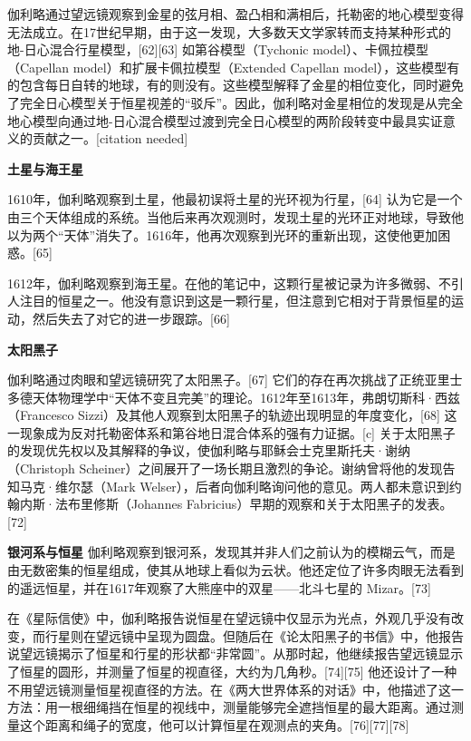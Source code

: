 伽利略通过望远镜观察到金星的弦月相、盈凸相和满相后，托勒密的地心模型变得无法成立。在17世纪早期，由于这一发现，大多数天文学家转而支持某种形式的地-日心混合行星模型，[62][63] 如第谷模型（Tychonic model）、卡佩拉模型（Capellan model）和扩展卡佩拉模型（Extended Capellan model），这些模型有的包含每日自转的地球，有的则没有。这些模型解释了金星的相位变化，同时避免了完全日心模型关于恒星视差的“驳斥”。因此，伽利略对金星相位的发现是从完全地心模型向通过地-日心混合模型过渡到完全日心模型的两阶段转变中最具实证意义的贡献之一。[citation needed]

\textbf{土星与海王星}  

1610年，伽利略观察到土星，他最初误将土星的光环视为行星，[64] 认为它是一个由三个天体组成的系统。当他后来再次观测时，发现土星的光环正对地球，导致他以为两个“天体”消失了。1616年，他再次观察到光环的重新出现，这使他更加困惑。[65]  

1612年，伽利略观察到海王星。在他的笔记中，这颗行星被记录为许多微弱、不引人注目的恒星之一。他没有意识到这是一颗行星，但注意到它相对于背景恒星的运动，然后失去了对它的进一步跟踪。[66]  

\textbf{太阳黑子}  

伽利略通过肉眼和望远镜研究了太阳黑子。[67] 它们的存在再次挑战了正统亚里士多德天体物理学中“天体不变且完美”的理论。1612年至1613年，弗朗切斯科·西兹（Francesco Sizzi）及其他人观察到太阳黑子的轨迹出现明显的年度变化，[68] 这一现象成为反对托勒密体系和第谷地日混合体系的强有力证据。[c] 关于太阳黑子的发现优先权以及其解释的争议，使伽利略与耶稣会士克里斯托夫·谢纳（Christoph Scheiner）之间展开了一场长期且激烈的争论。谢纳曾将他的发现告知马克·维尔瑟（Mark Welser），后者向伽利略询问他的意见。两人都未意识到约翰内斯·法布里修斯（Johannes Fabricius）早期的观察和关于太阳黑子的发表。[72]  

\textbf{银河系与恒星}  
伽利略观察到银河系，发现其并非人们之前认为的模糊云气，而是由无数密集的恒星组成，使其从地球上看似为云状。他还定位了许多肉眼无法看到的遥远恒星，并在1617年观察了大熊座中的双星——北斗七星的 Mizar。[73]  

在《星际信使》中，伽利略报告说恒星在望远镜中仅显示为光点，外观几乎没有改变，而行星则在望远镜中呈现为圆盘。但随后在《论太阳黑子的书信》中，他报告说望远镜揭示了恒星和行星的形状都“非常圆”。从那时起，他继续报告望远镜显示了恒星的圆形，并测量了恒星的视直径，大约为几角秒。[74][75] 他还设计了一种不用望远镜测量恒星视直径的方法。在《两大世界体系的对话》中，他描述了这一方法：用一根细绳挡在恒星的视线中，测量能够完全遮挡恒星的最大距离。通过测量这个距离和绳子的宽度，他可以计算恒星在观测点的夹角。[76][77][78]  

